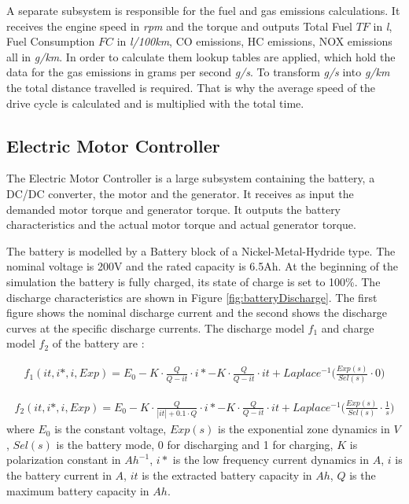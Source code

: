 A separate subsystem is responsible for the fuel and gas emissions calculations. It receives the engine speed in \textit{rpm} and the torque and outputs Total Fuel $TF$ in \textit{l}, Fuel Consumption $FC$ in \textit{l/100km}, CO emissions, HC emissions, NOX emissions all in \textit{g/km}. In order to calculate them lookup tables are applied, which hold the data for the gas emissions in grams per second \textit{g/s}. To transform \textit{g/s} into \textit{g/km} the total distance travelled is required. That is why the average speed of the drive cycle is calculated and is multiplied with the total time. 

\subsection{Electric Motor Controller}
The Electric Motor Controller is a large subsystem containing the battery, a DC/DC converter, the motor and the generator. It receives as input the demanded motor torque and generator torque. It outputs the battery characteristics and the actual motor torque and actual generator torque.

The battery is modelled by a Battery block of a Nickel-Metal-Hydride type. The nominal voltage is 200V and the rated capacity is 6.5Ah. At the beginning of the simulation the battery is fully charged, its state of charge is set to 100\%. The discharge characteristics are shown in Figure \ref{fig:batteryDischarge}. The first figure shows the nominal discharge current and the second shows the discharge curves at the specific discharge currents. The discharge model $f_1$ and charge model $f_2$ of the battery are \citep{batteryMatlab}:

\begin{equation}
\begin{split}
f_1(it,i*,i,Exp) = E_0 - K \cdot \frac{Q}{Q-it} \cdot i* - K \cdot \frac{Q}{Q-it} \cdot it + Laplace^{-1} \bigg( \frac{Exp(s)}{Sel(s)} \cdot 0 \bigg)
\end{split}
\end{equation}

\begin{equation}
\begin{split}
f_2(it,i*,i,Exp) = E_0 - K \cdot \frac{Q}{|it|+0.1 \cdot Q} \cdot i* - K \cdot \frac{Q}{Q-it} \cdot it + Laplace^{-1} \bigg( \frac{Exp(s)}{Sel(s)} \cdot \frac{1}{s} \bigg)
\end{split}
\end{equation}
where $E_0$ is the constant voltage, $Exp(s)$ is the exponential zone dynamics in $V$, $Sel(s)$ is the battery mode, 0 for discharging and 1 for charging, $K$ is polarization constant in $Ah^{-1}$, $i*$ is the low frequency current dynamics in $A$, $i$ is the battery current in $A$, $it$ is the extracted battery capacity in $Ah$, $Q$ is the maximum battery capacity in $Ah$.


